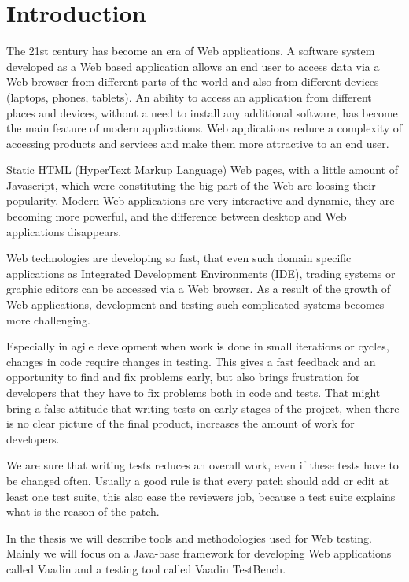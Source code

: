 	
	 \chapter{Introduction}
	 \label{ch:intro} 		
	The 21st century has become an era of Web applications. A software system
	developed as a Web based application allows an end user to access data via
	a Web browser from different parts of the world and also from different devices
	(laptops, phones, tablets). An ability to access an application from different
	places and devices, without a need to install any additional software,
	has become the main feature of modern applications. Web applications reduce a
	complexity of accessing products and services and make them more attractive to an end
	user.
	
	Static HTML (HyperText Markup Language) Web pages, with a little amount of
	Javascript, which were constituting the big part of the Web are loosing their popularity.
	Modern Web	applications are very interactive and dynamic, they are becoming
	more powerful, and the difference between desktop and Web applications
	disappears. 
	
	Web technologies are developing so fast, that even such domain
	specific applications as Integrated Development Environments (IDE), trading
	systems or graphic editors can be accessed via a Web browser. As a result of
	the growth of Web applications, development and testing such complicated
	systems becomes more challenging.
	
	Especially in agile development when work is done in small iterations or
	cycles, changes in code require changes in testing. This gives a fast feedback and
    an opportunity to find and fix problems early, but also brings frustration
    for developers that they have to fix problems both in code and tests. 
	That might bring a false attitude that writing tests on early stages of the project,
	 when there is no clear picture of the final product,
	 increases the amount of work for developers. 
 
	 We are sure that writing tests reduces an overall work,
	 even if these tests have to be changed often. Usually a good rule is that
	 every patch should add or edit at least one test suite, this also ease the
	 reviewers job, because a test suite explains what is the reason of the patch.
	
	In the thesis we will describe tools and methodologies used for Web testing.
	Mainly we will focus on a Java-base framework for developing Web applications
	called Vaadin and a testing tool called Vaadin TestBench.
	
